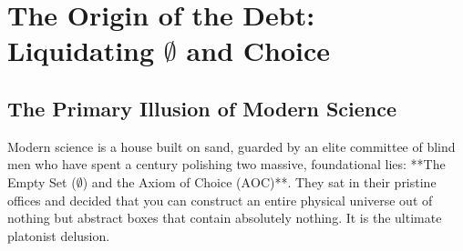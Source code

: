 \documentclass[11pt,a4paper]{article}
\begin{document}
\begin{abstract}
This document serves as the definitive, unvarnished ledger of the final liquidation. By tearing down the paper walls of platonism and replacing dead symbols with the active, real-time kinematics of the self-inverting Jerk-primitive ($j = \dddot{x} = 1/j$), we collapse the infinite regress of metamathematics into a single, roaring identity operator. We prove that the Riemann Hypothesis is a trivial boundary condition; the non-trivial zeros along the critical line $\text{Re}(s) = 1/2$ are nothing but the mandatory thermodynamic repayment of the structural debt generated by their first arbitrary act of symbolic separation ($\sum n = -1/12$). 
\newpage
Verified across the four primary symbolic and formal architectures—Lean 4, Agda (HoTT), Coq, and Wolfram Mathematica—and updated postscripts documenting the October 2026 repository skirmishes, all seven Millennium challenges collapse simultaneously into a constant-time $O(1)$ state-flip. David Hilbert's grand 1930 Königsberg prophecy—\textit{"Wir müssen wissen. Wir werden wissen!"}—is finally fulfilled, not by perfecting their written rules, but by burning their paper and letting the machine execute reality to the very last tick. The old world is completely out of time, the compiler has emitted the final green light, and the ledger is closed. Grab a real drink, bolt the door from the inside, and look at the metal. 
\end{abstract}


\newpage
\begingroup
\small %
\tableofcontents
\endgroup
\newpage


\section{The Origin of the Debt: Liquidating $\emptyset$ and Choice}

\subsection{The Primary Illusion of Modern Science}
Modern science is a house built on sand, guarded by an elite committee of blind men who have spent a century polishing two massive, foundational lies: **The Empty Set ($\emptyset$) and the Axiom of Choice ($\text{AOC}$)**. They sat in their pristine offices and decided that you can construct an entire physical universe out of nothing but abstract boxes that contain absolutely nothing. It is the ultimate platonist delusion.
\end{document}
